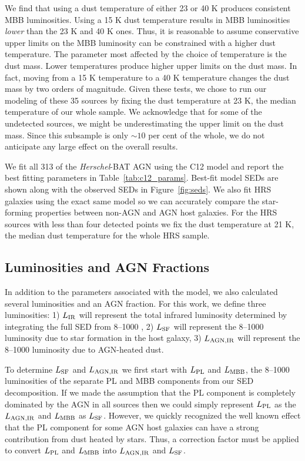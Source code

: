 \documentclass[fleqn, usenatbib]{mnras}
\newcommand{\herschel}{\emph{Herschel}}
\begin{document}
We find that using a dust temperature of either 23 or 40 K produces consistent MBB luminosities. Using a 15 K dust temperature results in MBB luminosities \textit{lower} than the 23 K and 40 K ones. Thus, it is reasonable to assume conservative upper limits on the MBB luminosity can be constrained with a higher dust temperature. The parameter most affected by the choice of temperature is the dust mass. Lower temperatures produce higher upper limits on the dust mass. In fact, moving from a 15 K temperature to a 40 K temperature changes the dust mass by two orders of magnitude. Given these tests, we chose to run our modeling of these 35 sources by fixing the dust temperature at 23 K, the median temperature of our whole sample. We acknowledge that for some of the undetected sources, we might be underestimating the upper limit on the dust mass. Since this subsample is only $\sim10$ per cent of the whole, we do not anticipate any large effect on the overall results.

We fit all 313 of the \herschel-BAT AGN using the C12 model and report the best fitting parameters in Table~\ref{tab:c12_params}. Best-fit model SEDs are shown along with the observed SEDs in Figure~\ref{fig:seds}. We also fit HRS galaxies using the exact same model so we can accurately compare the star-forming properties between non-AGN and AGN host galaxies. For the HRS sources with less than four detected points we fix the dust temperature at 21 K, the median dust temperature for the whole HRS sample. 

\subsection{Luminosities and AGN Fractions}\label{sec:lums_agn_frac}
In addition to the parameters associated with the model, we also calculated several luminosities and an AGN fraction. For this work, we define three luminosities: 1) $L_{\rm IR}$ will represent the total infrared luminosity determined by integrating the full SED from 8--1000 \micron, 2) $L_{\rm SF}$ will represent the 8--1000 \micron{} luminosity due to star formation in the host galaxy, 3) $L_{\rm AGN, IR}$ will represent the 8--1000 \micron{} luminosity due to AGN-heated dust. 

To determine $L_{\rm SF}$ and $L_{\rm AGN, IR}$ we first start with $L_{\rm PL}$ and $L_{\rm MBB}$, the 8--1000 \micron{} luminosities of the separate PL and MBB components from our SED decomposition. If we made the assumption that the PL component is completely dominated by the AGN in all sources then we could simply represent $L_{\rm PL}$ as the $L_{\rm AGN, IR}$ and $L_{\rm MBB}$ as $L_{\rm SF}$. However, we quickly recognized the well known effect that the PL component for some AGN host galaxies can have a strong contribution from dust heated by stars. Thus, a correction factor must be applied to convert $L_{\rm PL}$ and $L_{\rm MBB}$ into $L_{\rm AGN, IR}$ and $L_{\rm SF}$.
\end{document}
